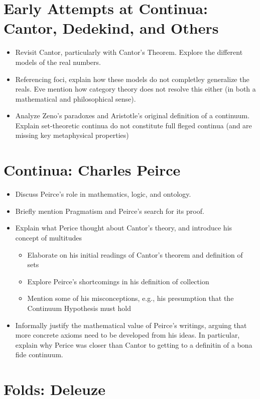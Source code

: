\section{Early Attempts at Continua: Cantor, Dedekind, and Others}
\begin{itemize}
  \item Revisit Cantor, particularly with Cantor's Theorem. Explore the different models of the real numbers.
  \item Referencing foci, explain how these models do not completley generalize the reals. Eve mention how category theory does not resolve this either (in both a mathematical and philosophical sense).
  \item Analyze Zeno's paradoxes and Aristotle's original definition of a continuum. Explain set-theoretic continua do not constitute full fleged continua (and are missing key metaphysical properties)
\end{itemize}

\section{Continua: Charles Peirce}
\begin{itemize}
  \item Discuss Peirce's role in mathematics, logic, and ontology.
  \item Briefly mention Pragmatism and Peirce's search for its proof.
  \item Explain what Perice thought about Cantor's theory, and introduce his concept of multitudes
  \begin{itemize}
    \item Elaborate on his initial readings of Cantor's theorem and definition of sets
    \item Explore Peirce's shortcomings in his definition of collection
    \item Mention some of his misconceptions, e.g., his presumption that the Continuum Hypothesis must hold
  \end{itemize}
  \item Informally justify the mathematical value of Peirce's writings, arguing that more concrete axioms need to be developed from his ideas. In particular, explain why Perice was closer than Cantor to getting to a definitin of a bona fide continuum.
\end{itemize}

\section{Folds: Deleuze}

